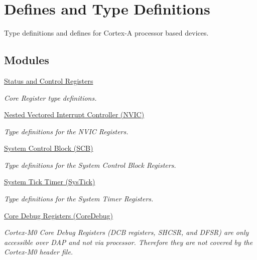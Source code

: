 \hypertarget{group___c_m_s_i_s__core__register}{}\section{Defines and Type Definitions}
\label{group___c_m_s_i_s__core__register}


Type definitions and defines for Cortex-\/A processor based devices.  


\subsection*{Modules}
\begin{DoxyCompactItemize}
\item 
\hyperlink{group___c_m_s_i_s___c_o_r_e}{Status and Control Registers}
\begin{DoxyCompactList}\small\item\em Core Register type definitions. \end{DoxyCompactList}\item 
\hyperlink{group___c_m_s_i_s___n_v_i_c}{Nested Vectored Interrupt Controller (\+N\+V\+I\+C)}
\begin{DoxyCompactList}\small\item\em Type definitions for the N\+V\+IC Registers. \end{DoxyCompactList}\item 
\hyperlink{group___c_m_s_i_s___s_c_b}{System Control Block (\+S\+C\+B)}
\begin{DoxyCompactList}\small\item\em Type definitions for the System Control Block Registers. \end{DoxyCompactList}\item 
\hyperlink{group___c_m_s_i_s___sys_tick}{System Tick Timer (\+Sys\+Tick)}
\begin{DoxyCompactList}\small\item\em Type definitions for the System Timer Registers. \end{DoxyCompactList}\item 
\hyperlink{group___c_m_s_i_s___core_debug}{Core Debug Registers (\+Core\+Debug)}
\begin{DoxyCompactList}\small\item\em Cortex-\/\+M0 Core Debug Registers (D\+CB registers, S\+H\+C\+SR, and D\+F\+SR) are only accessible over D\+AP and not via processor. Therefore they are not covered by the Cortex-\/\+M0 header file. \end{DoxyCompactList}\item 

\end{DoxyCompactItemize}
